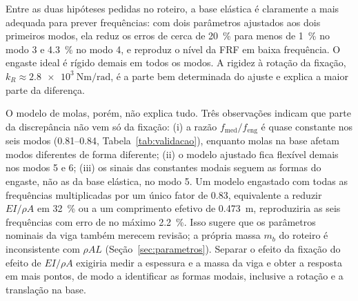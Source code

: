 Entre as duas hipóteses pedidas no roteiro, a base elástica é claramente a mais
adequada para prever frequências: com dois parâmetros ajustados aos dois primeiros
modos, ela reduz os erros de cerca de \SI{20}{\percent} para menos de
\SI{1}{\percent} no modo 3 e \SI{4.3}{\percent} no modo 4, e reproduz o nível da FRF
em baixa frequência. O engaste ideal é rígido demais em todos os modos. A rigidez à
rotação da fixação, $k_R \approx \SI{2.8e3}{\newton\meter\per\radian}$, é a parte bem
determinada do ajuste e explica a maior parte da diferença.

O modelo de molas, porém, não explica tudo. Três observações indicam que parte da
discrepância não vem só da fixação: (i) a razão $f_{\mathrm{med}}/f_{\mathrm{eng}}$ é
quase constante nos seis modos (\numrange{0.81}{0.84}, Tabela~\ref{tab:validacao}),
enquanto molas na base afetam modos diferentes de forma diferente; (ii) o modelo
ajustado fica flexível demais nos modos 5 e 6; (iii) os sinais das constantes modais
seguem as formas do engaste, não as da base elástica, no modo 5. Um modelo engastado
com todas as frequências multiplicadas por um único fator de \num{0.83}, equivalente a
reduzir $EI/\rho A$ em \SI{32}{\percent} ou a um comprimento efetivo de
\SI{0.473}{\meter}, reproduziria as seis frequências com erro de no máximo
\SI{2.2}{\percent}. Isso sugere que os parâmetros nominais da viga também merecem
revisão; a própria massa $m_b$ do roteiro é inconsistente com $\rho A L$
(Seção~\ref{sec:parametros}). Separar o efeito da fixação do efeito de $EI/\rho A$
exigiria medir a espessura e a massa da viga e obter a resposta em mais pontos, de
modo a identificar as formas modais, inclusive a rotação e a translação na base.

\FloatBarrier

